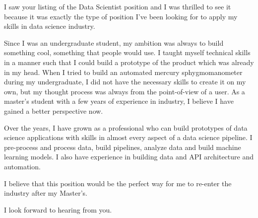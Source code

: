 I saw your listing of the Data Scientist position and I was thrilled to see it because it was exactly the type of position I've been looking for to apply my skills in data science industry.

Since I was an undergraduate student, my ambition was always to build something cool, something that people would use. I taught myself technical skills in a manner such that I could build a prototype of the product which was already in my head. When I tried to build an automated mercury sphygmomanometer during my undergraduate, I did not have the necessary skills to create it on my own, but my thought process was always from the point-of-view of a user. As a master's student with a few years of experience in industry, I believe I have gained a better perspective now.

Over the years, I have grown as a professional who can build prototypes of data science applications with skills in almost every aspect of a data science pipeline. I pre-process and process data, build pipelines, analyze data and build machine learning models. I also have experience in building data and API architecture and automation.

I believe that this position would be the perfect way for me to re-enter the industry after my Master's. 

I look forward to hearing from you.